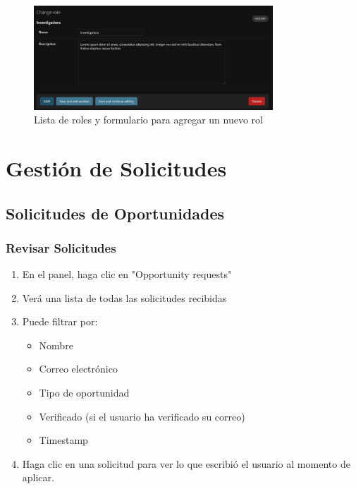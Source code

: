 \documentclass[12pt,letterpaper]{report}
\begin{document}
\begin{figure}[H]
    \centering
    \includegraphics[width=0.8\textwidth]{images/role.png}
    \caption{Lista de roles y formulario para agregar un nuevo rol}
\end{figure}



\chapter{Gestión de Solicitudes}

\section{Solicitudes de Oportunidades}
\subsection{Revisar Solicitudes}
\begin{enumerate}
    \item En el panel, haga clic en "Opportunity requests"
    \item Verá una lista de todas las solicitudes recibidas
    \item Puede filtrar por:
        \begin{itemize}
            \item Nombre
            \item Correo electrónico
            \item Tipo de oportunidad
            \item Verificado (si el usuario ha verificado su correo)
            \item Timestamp
        \end{itemize}
    \item Haga clic en una solicitud para ver lo que escribió el usuario al momento de aplicar.
\end{enumerate}
\end{document}
